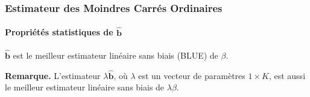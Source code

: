 \documentclass[10pt]{beamer}
\theoremstyle{plain}
\begin{document}
\begin{frame}
  \frametitle{Estimateur des Moindres Carrés Ordinaires}
  \framesubtitle {Propriétés statistiques de $\hat{\mathbf b}$}


  \begin{theorem}\label{thm:Gauss-Markov}
    $\hat{\mathbf b}$ est le meilleur estimateur linéaire sans biais (BLUE) de $\beta$.
  \end{theorem}

  \bigskip\bigskip

  \textbf{Remarque.} L'estimateur $\lambda \hat{\mathbf b}$, où $\lambda$ est un vecteur de paramètres $1\times K$, est aussi le meilleur estimateur linéaire sans biais de $\lambda \beta$.
\end{frame}


\begin{notes}


\end{notes}
\end{document}
